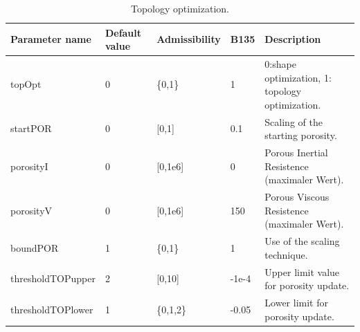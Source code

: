 \documentclass[oneside]{article}
\numberwithin{equation}{section}
\numberwithin{figure}{section}
\numberwithin{figure}{section}
\begin{document}
\begin{table}[h]
    \centering
    \begin{tabular}{|p{2.7cm}|p{1cm}|p{1.2cm}|p{0.9cm}|p{4.7cm}|} %
        \hline
        \cellcolor{light-gray} Parameter name & \cellcolor{light-gray} Default value & \cellcolor{light-gray} Admissibility  & \cellcolor{light-gray} B135 & \cellcolor{light-gray} Description \\
        \hline
        topOpt                  &  0  &  \{0,1\}          &  1   & 0:shape optimization, 1: topology optimization.\\
        \hline
        startPOR                &  0  &  [0,1]            &  0.1 & Scaling of the starting porosity.\\
        \hline
        porosityI               &  0  &  [0,1e6]          &  0   & Porous Inertial Resistence (maximaler Wert).\\
        \hline 
        porosityV               &  0  &  [0,1e6]          &  150 & Porous Viscous Resistence (maximaler Wert).\\
        \hline
        boundPOR                &  1  &  \{0,1\}          &  1   & Use of the scaling technique.\\
        \hline
        thresholdTOPupper       &  2  &  [0,10]           &-1e-4 & Upper limit value for porosity update.\\
        \hline
        thresholdTOPlower       &  1  &  \{0,1,2\}        &-0.05 & Lower limit for porosity update.\\
        \hline
    \end{tabular}
    \caption{Topology optimization.}\label{tab:parameter10a}
\end{table}
$ $\\
\newpage
\end{document}
